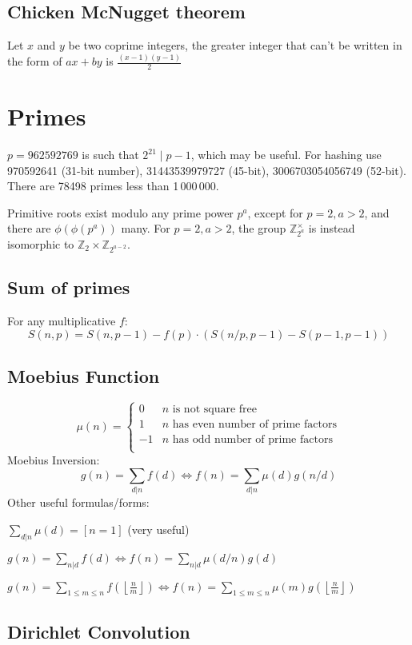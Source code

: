 \subsection{Chicken McNugget theorem}
	Let $x$ and $y$ be two coprime integers, the greater integer that can't be written in the form of $ax + by$ is $\frac{(x-1)(y-1)}{2}$

\section{Primes}
	$p=962592769$ is such that $2^{21} \mid p-1$, which may be useful. For hashing
	use 970592641 (31-bit number), 31443539979727 (45-bit), 3006703054056749
	(52-bit). There are 78498 primes less than 1\,000\,000.

	Primitive roots exist modulo any prime power $p^a$, except for $p = 2, a > 2$, and there are $\phi(\phi(p^a))$ many.
	For $p = 2, a > 2$, the group $\mathbb Z_{2^a}^\times$ is instead isomorphic to $\mathbb Z_2 \times \mathbb Z_{2^{a-2}}$.

\subsection{Sum of primes} For any multiplicative $f$:
                \[ S(n,p) = S(n, p-1) - f(p) \cdot (S(n/p,p-1) - S(p-1,p-1))\]

\subsection{Moebius Function}
\[
	\mu(n) = \begin{cases} 0 & n \textrm{ is not square free}\\ 1 & n \textrm{ has even number of prime factors}\\ -1 & n \textrm{ has odd number of prime factors}\\\end{cases}
\]
  Moebius Inversion:
  \[ g(n) = \sum_{d|n} f(d) \Leftrightarrow f(n) = \sum_{d|n} \mu(d)g(n/d) \]
  Other useful formulas/forms:

  $ \sum_{d | n} \mu(d) = [ n = 1] $ (very useful)

  $ g(n) = \sum_{n|d} f(d) \Leftrightarrow f(n) = \sum_{n|d} \mu(d/n)g(d)$

 $ g(n) = \sum_{1 \leq m \leq n} f(\left\lfloor\frac{n}{m}\right \rfloor ) \Leftrightarrow f(n) = \sum_{1\leq m\leq n} \mu(m)g(\left\lfloor\frac{n}{m}\right\rfloor)$


\subsection{Dirichlet Convolution}

